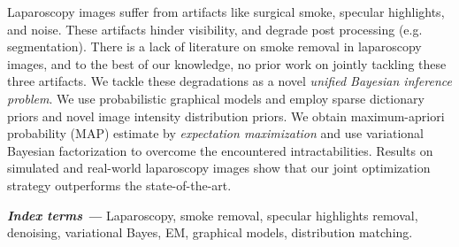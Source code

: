 \begin{Abstract}
Laparoscopy images suffer from artifacts like surgical smoke, specular highlights, and noise. These artifacts hinder visibility, and degrade post processing (e.g. segmentation). There is a lack of literature on smoke removal in laparoscopy images, and to the best of our knowledge, no prior work on jointly tackling these three artifacts. We tackle these degradations as a novel \emph{unified Bayesian inference problem}. We use probabilistic graphical models and employ sparse dictionary priors and novel image intensity distribution priors. We obtain maximum-apriori probability (MAP) estimate by \emph{expectation maximization} and use variational Bayesian factorization to overcome the encountered intractabilities. Results on simulated and real-world laparoscopy images show that our joint optimization strategy outperforms the state-of-the-art.

\textbf{\textit{Index terms ---}} Laparoscopy, smoke removal, specular highlights removal, denoising, variational Bayes, EM, graphical models, distribution matching.
%
%
%
%
%
\end{Abstract}

